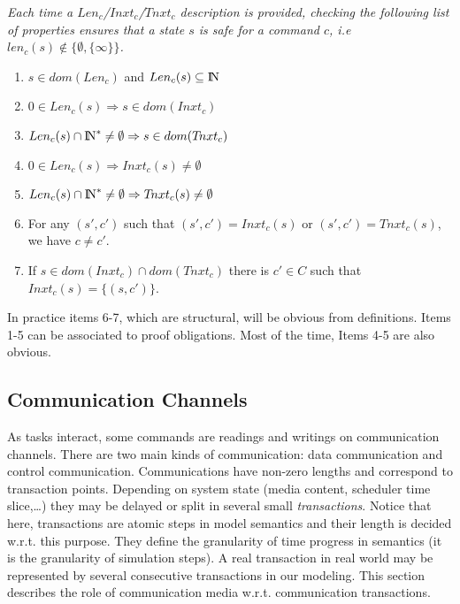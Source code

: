 \documentclass{article}
\newcommand{\NAT}{\mbox{\normalfont I$\!$N}}
\begin{document}
\begin{boxedminipage}{15cm}\label{safestates}
{\em Each time a $Len_c$/$Inxt_c$/$T\!nxt_c$ description is provided, checking the following list of properties ensures that a state $s$ is safe for a command $c$, i.e $len_c(s)\notin\{\emptyset,\{\infty\}\}$.}
\begin{enumerate}
\item $s\in dom(Len_c)$ and $Len_c(s)\subseteq\NAT$
\item $0\in Len_c(s)\Rightarrow s\in dom(Inxt_c)$
\item $Len_c(s)\cap\NAT^*\neq\emptyset\Rightarrow s\in dom(T\!nxt_c)$
\item $0\in Len_c(s)\Rightarrow Inxt_c(s)\neq \emptyset$
\item $Len_c(s)\cap\NAT^*\neq\emptyset\Rightarrow T\!nxt_c(s)\neq \emptyset$
\item For any $(s',c')$ such that $(s',c')=Inxt_c(s)$ or $(s',c')=T\!nxt_c(s)$, we have $c\neq c'$.
\item If $s\in dom(Inxt_c)\cap dom(T\!nxt_c)$ there is $c'\in C$ such that $Inxt_c(s)=\{(s,c')\}$.
\end{enumerate}
\end{boxedminipage}

In practice items 6-7, which are structural, will be obvious from definitions. Items 1-5 can be associated to proof obligations. Most of the time, Items 4-5 are also obvious.

\subsection{Communication Channels}\label{subsec-channelsem}
As tasks interact, some commands are readings and writings on communication channels. There are two main kinds of communication: data communication and control communication. Communications have non-zero lengths and correspond to transaction points. Depending on system state (media content, scheduler time slice,\ldots) they may be delayed or split in several small {\em transactions}. Notice that here, transactions are atomic steps in model semantics and their length is decided w.r.t. this purpose. They define the granularity of time progress in semantics (it is the granularity of simulation steps). A real transaction in real world may be represented by several consecutive transactions in our modeling. This section describes the role of communication media w.r.t. communication transactions.
\end{document}
